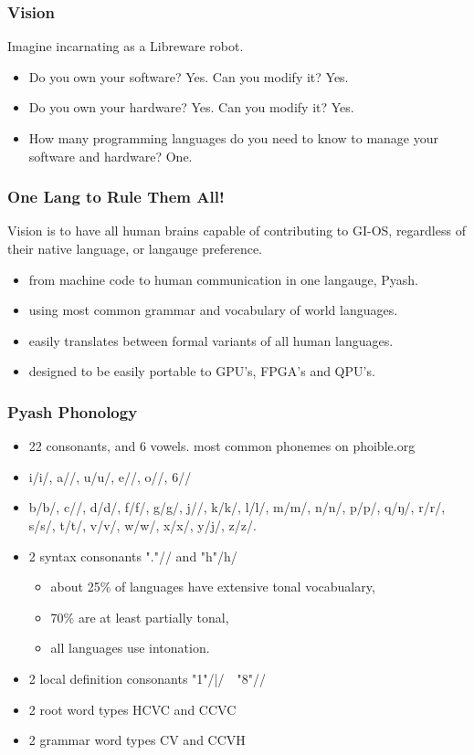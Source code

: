 \documentclass{beamer}
\begin{document}
\begin{frame}
  \frametitle{Vision}
  Imagine incarnating as a Libreware robot. 
  \begin{itemize}
    \item Do you own your software? Yes. Can you modify it? Yes.
    \item Do you own your hardware? Yes. Can you modify it? Yes.
    \item How many programming languages do you need to know to manage your
software and hardware? One.
  \end{itemize}
\end{frame}

\begin{frame}
  \frametitle{One Lang to Rule Them All!}
  Vision is to have all human brains capable of contributing to GI-OS,
  regardless of their native language, or langauge preference. 
  \begin{itemize}
    \item from machine code to human communication in one langauge, Pyash.
    \item using most common grammar and vocabulary of world languages. 
    \item easily translates between formal variants of all human languages.
    \item designed to be easily portable to GPU's, FPGA's and QPU's.
  \end{itemize}
\end{frame}

\begin{frame}
  \frametitle{Pyash Phonology}
  \begin{itemize}
    \item 22 consonants, and 6 vowels. most common phonemes on phoible.org 
    \item i/i/, a//, u/u/, e//, o//, 6//
    \item b/b/, c//, d/d/, f/f/, g/g/, j//, k/k/, l/l/, m/m/, n/n/, p/p/, q/ŋ/, r/r/, s/s/, t/t/, v/v/, w/w/, x/x/, y/j/, z/z/.
    \item 2 syntax consonants "."// and "h"/h/
    \begin{itemize}
        \item about 25\% of languages have extensive tonal vocabualary,
        \item 70\% are at least partially tonal,
        \item all languages use intonation. 
    \end{itemize}
    \item 2 local definition consonants "1"/|/　"8"/\textipa{||}/
    \item 2 root word types HCVC and CCVC
    \item 2 grammar word types CV and CCVH
  \end{itemize}
\end{frame}
\end{document}
